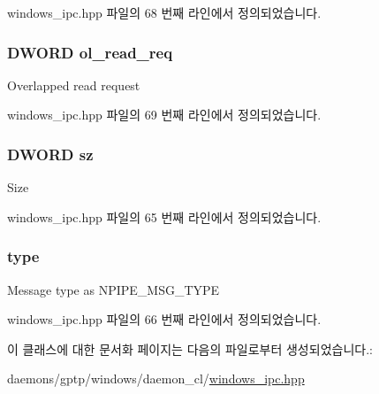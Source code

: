 windows\+\_\+ipc.\+hpp 파일의 68 번째 라인에서 정의되었습니다.

\subsubsection[{\texorpdfstring{ol\+\_\+read\+\_\+req}{ol_read_req}}]{\setlength{\rightskip}{0pt plus 5cm}D\+W\+O\+RD ol\+\_\+read\+\_\+req\hspace{0.3cm}{\ttfamily [protected]}}\hypertarget{class_windows_n_pipe_message_a00febefc15f04548b030593221502d72}{}\label{class_windows_n_pipe_message_a00febefc15f04548b030593221502d72}
Overlapped read request 

windows\+\_\+ipc.\+hpp 파일의 69 번째 라인에서 정의되었습니다.

\subsubsection[{\texorpdfstring{sz}{sz}}]{\setlength{\rightskip}{0pt plus 5cm}D\+W\+O\+RD sz\hspace{0.3cm}{\ttfamily [protected]}}\hypertarget{class_windows_n_pipe_message_a09171c54248e2b5629cb28432fc246f7}{}\label{class_windows_n_pipe_message_a09171c54248e2b5629cb28432fc246f7}
Size 

windows\+\_\+ipc.\+hpp 파일의 65 번째 라인에서 정의되었습니다.

\subsubsection[{\texorpdfstring{type}{type}}]{ type\hspace{0.3cm}{\ttfamily [protected]}}\hypertarget{class_windows_n_pipe_message_af23d76d201079e292145d5f0acda4940}{}\label{class_windows_n_pipe_message_af23d76d201079e292145d5f0acda4940}
Message type as N\+P\+I\+P\+E\+\_\+\+M\+S\+G\+\_\+\+T\+Y\+PE 

windows\+\_\+ipc.\+hpp 파일의 66 번째 라인에서 정의되었습니다.



이 클래스에 대한 문서화 페이지는 다음의 파일로부터 생성되었습니다.\+:\begin{DoxyCompactItemize}
\item 
daemons/gptp/windows/daemon\+\_\+cl/\hyperlink{windows__ipc_8hpp}{windows\+\_\+ipc.\+hpp}\end{DoxyCompactItemize}
